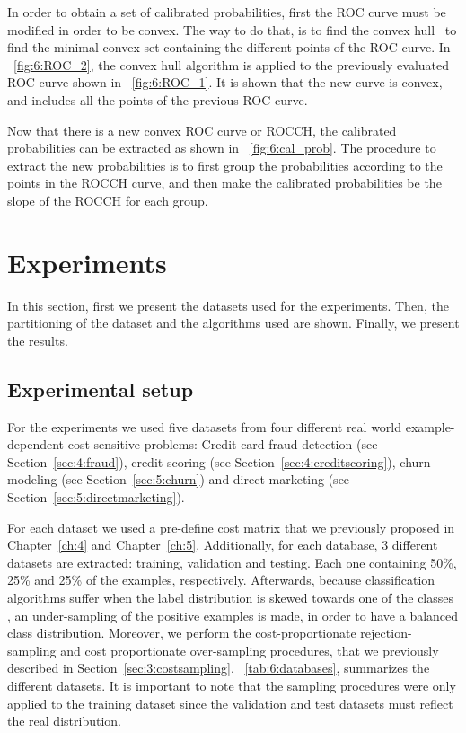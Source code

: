In order to obtain a set of calibrated probabilities, first the ROC curve must be modified in 
order to be convex. The way to do that, is to find the convex \mbox{hull 
\citep{Hernandez-Orallo2012}} to find the minimal convex set containing the different 
points of the ROC curve. In \figurename{~\ref{fig:6:ROC_2}}, the convex hull algorithm is applied 
to the previously evaluated ROC curve shown in \figurename{~\ref{fig:6:ROC_1}}. It is shown that 
the new curve is convex, and includes all the points of the previous ROC curve.

Now that there is a new convex ROC curve or ROCCH, the calibrated probabilities can be extracted 
as shown in  \figurename{~\ref{fig:6:cal_prob}}. The procedure to extract the new probabilities is 
to first group the probabilities according to the points in the ROCCH curve, and then make the 
calibrated  probabilities be the slope of the ROCCH for each group.
  
   
\section{Experiments}
\label{sec:6:experiments}

In this section, first we present the datasets used for the experiments. Then, the 
partitioning of the dataset and the algorithms used are shown. Finally, we present the results.

\subsection{Experimental setup}

For the experiments we used five datasets from four different real world example-dependent 
cost-sensitive problems: Credit card fraud detection (see Section~\ref{sec:4:fraud}), credit 
scoring (see Section~\ref{sec:4:creditscoring}), churn modeling (see Section~\ref{sec:5:churn}) and 
direct marketing (see Section~\ref{sec:5:directmarketing}).

For each dataset we used a pre-define cost matrix that we previously proposed in 
Chapter~\ref{ch:4} and Chapter~\ref{ch:5}. Additionally,  for each database, 3 different 
datasets are extracted: training, 
validation and testing. Each one containing 50\%, 25\% and 25\% of the examples, 
respectively. Afterwards, because classification algorithms suffer when the label distribution is 
skewed towards one of the classes \citep{Hastie2009}, an under-sampling of the positive examples is 
made, in order to have a balanced class distribution. Moreover, we perform the cost-proportionate 
rejection-sampling and cost proportionate over-sampling procedures, that we previously described in 
Section~\ref{sec:3:costsampling}. \tablename{~\ref{tab:6:databases}}, summarizes the 
different datasets. It is important to note that the sampling procedures were only applied to the 
training dataset since the validation and test datasets must reflect the real distribution.

